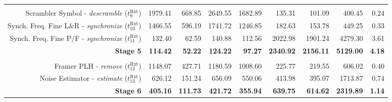 \begin{table}[htp]
{{\begin{tabular}{r | r r r r  | r r r | r}
                                                                              &                  &                   &                   &                                         &                   &                   &                   &                \\
                 Scrambler Symbol -   \emph{descramble} ($t^\text{Rxt}_{9}$)  &         1979.41  &           668.85  &          2649.55  &                                 1682.89 &           135.31  &           101.09  &           400.45  &          0.24  \\
           Synch. Freq. Fine L\&R -  \emph{synchronize} ($t^\text{Rxt}_{10}$) &         1466.55  &           596.19  &          1741.72  &                                 1246.85 &           182.63  &           153.78  &           449.25  &          0.33  \\
            Synch. Freq. Fine P/F -  \emph{synchronize} ($t^\text{Rxt}_{11}$) &          132.40  &            62.59  &           140.88  &                                  112.56 &          2022.98  &          1901.24  &          4279.30  &          3.61  \\ \hline
                 \textbf{Stage 5}                                             &  \textbf{114.42} &    \textbf{52.22} &   \textbf{124.22} &                          \textbf{97.27} &  \textbf{2340.92} &  \textbf{2156.11} &  \textbf{5129.00} &  \textbf{4.18} \\ %
                                                                              &                  &                   &                   &                                         &                   &                   &                   &                \\
                       Framer PLH -       \emph{remove} ($t^\text{Rxt}_{12}$) &         1148.07  &           427.71  &          1180.59  &                                1008.60  &           225.77  &           219.55  &           606.02  &          0.40  \\
                  Noise Estimator -     \emph{estimate} ($t^\text{Rxt}_{13}$) &          626.12  &           151.24  &           656.09  &                                 550.06  &           413.98  &           395.07  &          1713.87  &          0.74  \\ \hline
                 \textbf{Stage 6}                                             &  \textbf{405.16} &   \textbf{111.73} &   \textbf{421.72} &                         \textbf{355.94} &   \textbf{639.75} &   \textbf{614.62} &  \textbf{2319.89} &  \textbf{1.14} \\ %

\end{tabular}}}
\end{table}
